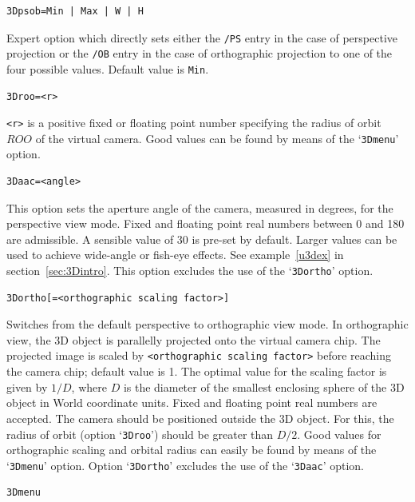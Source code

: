 \documentclass[a4paper]{article}
\begin{document}
\begin{verbatim}
3Dpsob=Min | Max | W | H
\end{verbatim}
Expert option which directly sets either the \verb+/PS+ entry in the case of perspective projection or the \verb+/OB+ entry in the case of orthographic projection to one of the four possible values. Default value is \verb+Min+.
\begin{verbatim}
3Droo=<r>
\end{verbatim}
\verb+<r>+ is a positive fixed or floating point number specifying the radius of orbit $ROO$ of the virtual camera. Good values can be found by means of the `\verb+3Dmenu+' option.
\begin{verbatim}
3Daac=<angle>
\end{verbatim}
This option sets the aperture angle of the camera, measured in degrees, for the perspective view mode. Fixed and floating point real numbers between 0 and 180 are admissible. A sensible value of 30 is pre-set by default. Larger values can be used to achieve wide-angle or fish-eye effects. See example~\ref{u3dex} in section~\ref{sec:3Dintro}. This option excludes the use of the `\verb+3Dortho+' option.
\begin{verbatim}
3Dortho[=<orthographic scaling factor>]
\end{verbatim}
Switches from the default perspective to orthographic view mode. In orthographic view, the 3D object is parallelly projected onto the virtual camera chip. The projected image is scaled by \verb+<orthographic scaling factor>+ before reaching the camera chip; default value is 1. The optimal value for the scaling factor is given by $1/D$, where $D$ is the diameter of the smallest enclosing sphere of the 3D object in World coordinate units. Fixed and floating point real numbers are accepted. The camera should be positioned outside the 3D object. For this, the radius of orbit (option `\verb+3Droo+') should be greater than $D/2$. Good values for orthographic scaling and orbital radius can easily be found by means of the `\verb+3Dmenu+' option. Option `\verb+3Dortho+' excludes the use of the `\verb+3Daac+' option.
\hypertarget{3dmenu}{}%
\begin{verbatim}
3Dmenu
\end{verbatim}
\end{document}
